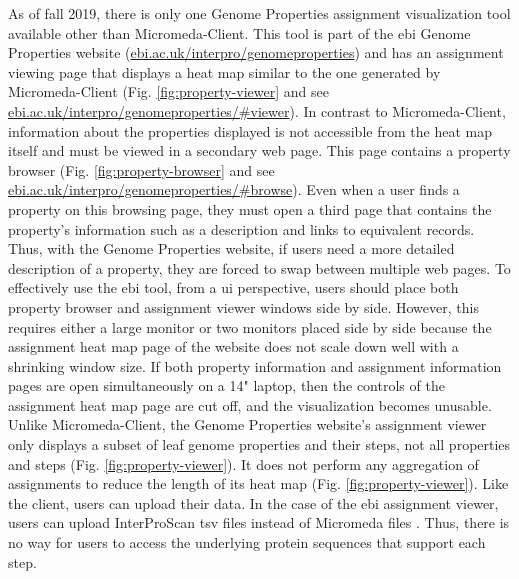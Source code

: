 As of fall 2019, there is only one Genome Properties assignment visualization 
tool available other than Micromeda-Client. This tool is part of the \gls{ebi}  
Genome Properties website \cite{richardson2018genome} 
(\href{http://www.ebi.ac.uk/interpro/genomeproperties}{ebi.ac.uk/interpro/genomeproperties}) 
and has an assignment viewing page that displays a heat map similar to the one 
generated by Micromeda-Client \cite{richardson2018genome}  (Fig. 
\ref{fig:property-viewer} and see 
\href{http://www.ebi.ac.uk/interpro/genomeproperties/#viewer}{ebi.ac.uk/interpro/genomeproperties/\#viewer}). 
In contrast to Micromeda-Client, information about the properties displayed is 
not accessible from the heat map itself and must be viewed in a secondary web 
page. This page contains a property browser (Fig. \ref{fig:property-browser} and 
see 
\href{http://www.ebi.ac.uk/interpro/genomeproperties/#browse}{ebi.ac.uk/interpro/genomeproperties/\#browse}). 
Even when a user finds a property on this browsing page, they must open a third 
page that contains the property's information such as a description and links to 
equivalent records. Thus, with the Genome Properties website, if users need a 
more detailed description of a property, they are forced to swap between 
multiple web pages. To effectively use the \gls{ebi}  tool, from a \gls{ui}  
perspective, users should place both property browser and assignment viewer 
windows side by side. However, this requires either a large monitor or two 
monitors placed side by side because the assignment heat map page of the website 
does not scale down well with a shrinking window size. If both property 
information and assignment information pages are open simultaneously on a 14" 
laptop, then the controls of the assignment heat map page are cut off, and the 
visualization becomes unusable. Unlike Micromeda-Client, the Genome Properties 
website's assignment viewer only displays a subset of leaf genome properties and 
their steps, not all properties and steps (Fig. \ref{fig:property-viewer}). It 
does not perform any aggregation of assignments to reduce the length of its heat 
map (Fig. \ref{fig:property-viewer}). Like the client, users can upload their 
data. In the case of the \gls{ebi}  assignment viewer, users can upload 
InterProScan \gls{tsv} files instead of Micromeda files 
\cite{richardson2018genome}. Thus, there is no way for users to access the 
underlying protein sequences that support each step.

